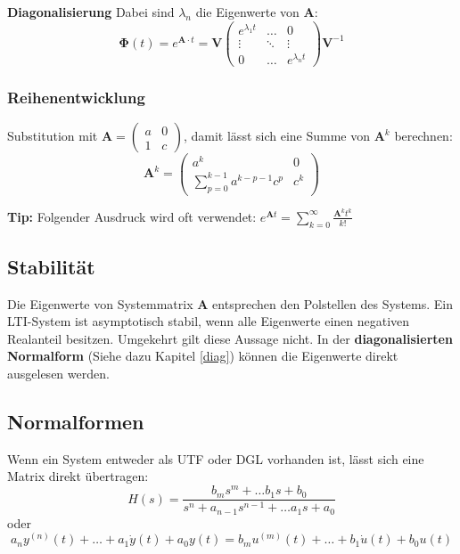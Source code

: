 \textbf{Diagonalisierung}
Dabei sind $\lambda_n$ die Eigenwerte von $\mathbf{A}$:
\[
\mathbf{\Phi}(t) = e^{\mathbf{A}\cdot t} = \mathbf{V}\begin{pmatrix}
	e^{\lambda_1t} & \dots & 0 \\
	\vdots & \ddots & \vdots \\
	0 & \dots & 	e^{\lambda_nt}
\end{pmatrix}\mathbf{V}^{-1}
\]

\subsubsection{Reihenentwicklung}
Substitution mit $\mathbf{A} = \begin{pmatrix}
	a & 0 \\ 1 & c
\end{pmatrix}$, damit lässt sich eine Summe von $\mathbf{A}^k$ berechnen:
\[
\mathbf{A}^k = \begin{pmatrix}
	a^k & 0 \\
	\sum\limits_{p = 0}^{k - 1}a^{k-p-1}c^p & c^k
\end{pmatrix}
\]

\textbf{Tip:} Folgender Ausdruck wird oft verwendet: $e^{\mathbf{A}t} = \sum\limits_{k=0}^{\infty}\frac{\mathbf{A}^kt^k}{k!}$

\subsection{Stabilität}
Die Eigenwerte von Systemmatrix $\mathbf{A}$ entsprechen den Polstellen des Systems. Ein LTI-System ist asymptotisch stabil, wenn alle Eigenwerte einen negativen Realanteil besitzen. Umgekehrt gilt diese Aussage nicht. In der \textbf{diagonalisierten Normalform} (Siehe dazu Kapitel \ref{diag}) können die Eigenwerte direkt ausgelesen werden.

\subsection{Normalformen}
Wenn ein System entweder als UTF oder DGL vorhanden ist, lässt sich eine Matrix direkt übertragen:
\[
H(s) = \frac{b_{m}s^{m} + \dots b_1s + b_0}{s^n + a_{n-1}s^{n-1} + \dots a_1s + a_0}
\]
oder \[
a_ny^{(n)}(t) + \dots + a_1\dot{y}(t) + a_0y(t) = b_mu^{(m)}(t) + \dots + b_1\dot{u}(t) + b_0u(t)
\]


